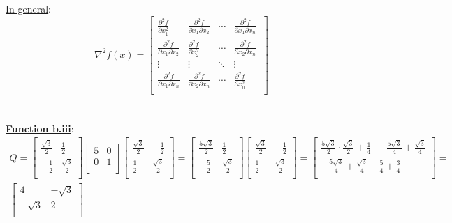 \documentclass[fleqn]{article}
\begin{document}
\newcommand\tab[1][1cm]{\hspace*{#1}}

\underline{In general}: \\

\[
\nabla^2 f(x) =
\begin{bmatrix} 
	\frac{\partial^2 f}{\partial x_1^2} & \frac{\partial^2 f}{\partial x_1 \partial x_2} & \cdots & \frac{\partial^2 f}{\partial x_1 \partial x_n}\
\\ 
	\frac{\partial^2 f}{\partial x_1 \partial x_2} & \frac{\partial^2 f}{\partial x_2^2} & \cdots & \frac{\partial^2 f}{\partial x_2 \partial x_n} \\ 
	\vdots & \vdots & \ddots & \vdots \\ 
	\frac{\partial^2 f}{\partial x_1 \partial x_n} & \frac{\partial^2 f}{\partial x_2 \partial x_n} & \cdots & \frac{\partial^2 f}{\partial x_n^2} \\ 
\end{bmatrix}
\]\\ \\

\underline{\textbf{Function b.iii}}:\\
\begin{multline*}
Q = 
\begin{bmatrix} 
	\frac{\sqrt{3}}{2} & \frac{1}{2} \\ 
	-\frac{1}{2} & \frac{\sqrt{3}}{2} \\ 
\end{bmatrix}
\begin{bmatrix} 5 & 0 \\ 0 & 1 \\ \end{bmatrix}
\begin{bmatrix} 
	\frac{\sqrt{3}}{2} & -\frac{1}{2} \\ 
	\frac{1}{2} & \frac{\sqrt{3}}{2} \\ 
\end{bmatrix}
=
\begin{bmatrix} 
	\frac{5\sqrt{3}}{2} & \frac{1}{2} \\ 
	-\frac{5}{2} & \frac{\sqrt{3}}{2} \\ 
\end{bmatrix}
\begin{bmatrix} 
	\frac{\sqrt{3}}{2} & -\frac{1}{2} \\ 
	\frac{1}{2} & \frac{\sqrt{3}}{2} \\ 
\end{bmatrix}
=
\begin{bmatrix} 
	\frac{5\sqrt{3}}{2} \cdot \frac{\sqrt{3}}{2} + \frac{1}{4} &
	-\frac{5 \sqrt{3}}{4} + \frac{\sqrt{3}}{4} \\ 
	-\frac{5 \sqrt{3}}{4} + \frac{\sqrt{3}}{4}                 &
	\frac{5}{4} + \frac{3}{4} \\ 
\end{bmatrix}
= \\
\begin{bmatrix} 
	4         &	-\sqrt{3} \\ 
	-\sqrt{3} &2          \\ 
\end{bmatrix}
\end{multline*}
\end{document}
